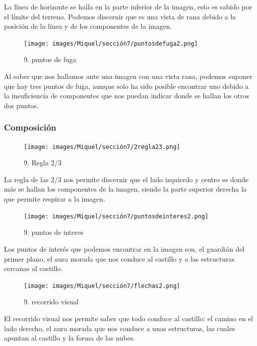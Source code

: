 \documentclass[12pt]{article}
\begin{document}
    La línea de horizonte se halla en la parte inferior de la imagen, esto es sabido por el límite del terreno. Podemos discernir que es una vista de rana debido a la posición de la línea y de los componentes de la imagen.
    
    \begin{figure}[H]
      \centering
      \texttt{[image: images/Miquel/sección7/puntosdefuga2.png]}
      \caption{\small 9. puntos de fuga}
    \end{figure}

    Al saber que nos hallamos ante una imagen con una vista rana, podemos suponer que hay tres puntos de fuga, aunque solo ha sido posible encontrar uno debido a la insuficiencia de componentes que nos puedan indicar donde se hallan los otros dos puntos.

        \subsubsection{Composición}
    \begin{figure}[H]
      \centering
      \texttt{[image: images/Miquel/sección7/2regla23.png]}
      \caption{\small 9. Regla 2/3}
    \end{figure}
    
    La regla de las 2/3 nos permite discernir que el lado izquierdo y centro es donde más se hallan los componentes de la imagen, siendo la parte superior derecha la que permite respirar a la imagen.

    \begin{figure}[H]
      \centering
      \texttt{[image: images/Miquel/sección7/puntosdeinteres2.png]}
      \caption{\small 9. puntos de interes}
    \end{figure}

    Los puntos de interés que podemos encontrar en la imagen son, el guardián del primer plano, el aura morada que nos conduce al castillo y a las estructuras cercanas al castillo.

    \begin{figure}[H]
      \centering
      \texttt{[image: images/Miquel/sección7/flechas2.png]}
      \caption{\small 9. recorrido visual}
    \end{figure}

    El recorrido visual nos permite saber que todo conduce al castillo: el camino en el lado derecho, el aura morada  que nos conduce a unas estructuras, las cuales apuntan al castillo y la forma de las nubes.
\end{document}
